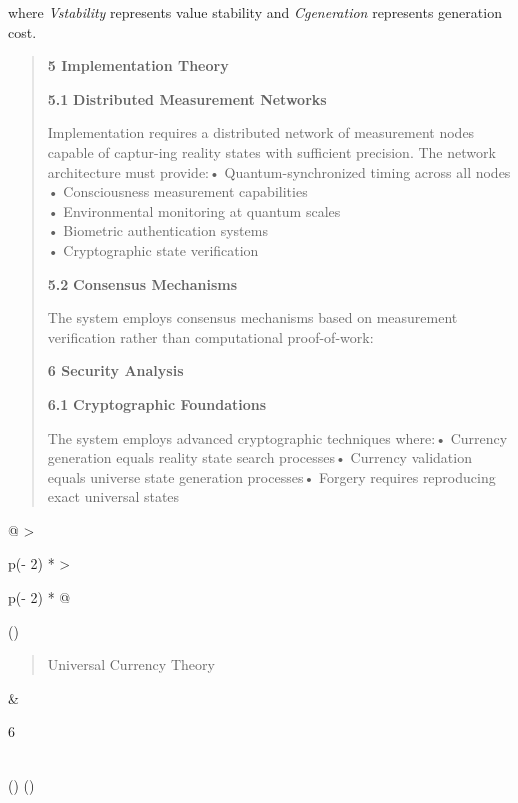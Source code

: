 \documentclass[
]{article}
\begin{document}
where \emph{Vstability} represents value stability and
\emph{Cgeneration} represents generation cost.

\begin{quote}
\textbf{5 Implementation Theory}

\textbf{5.1} \textbf{Distributed Measurement Networks}

Implementation requires a distributed network of measurement nodes
capable of captur-ing reality states with sufficient precision. The
network architecture must provide:• Quantum-synchronized timing across
all nodes\\
• Consciousness measurement capabilities\\
• Environmental monitoring at quantum scales\\
• Biometric authentication systems\\
• Cryptographic state verification

\textbf{5.2} \textbf{Consensus Mechanisms}

The system employs consensus mechanisms based on measurement
verification rather than computational proof-of-work:

\textbf{6 Security Analysis}

\textbf{6.1} \textbf{Cryptographic Foundations}

The system employs advanced cryptographic techniques where:• Currency
generation equals reality state search processes• Currency validation
equals universe state generation processes• Forgery requires reproducing
exact universal states
\end{quote}

\begin{longtable}[]{@{}
  >{\raggedright\arraybackslash}p{(\columnwidth - 2\tabcolsep) * }
  >{\raggedright\arraybackslash}p{(\columnwidth - 2\tabcolsep) * }@{}}
\toprule()
\begin{minipage}[b]{\linewidth}\raggedright
\begin{quote}
Universal Currency Theory
\end{quote}
\end{minipage} & \begin{minipage}[b]{\linewidth}\raggedright
6
\end{minipage} \\
\midrule()
\endhead
\bottomrule()
\end{longtable}
\end{document}
